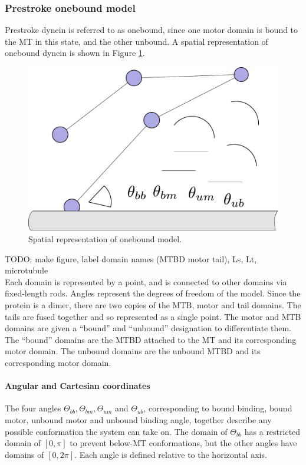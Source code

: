 \documentclass[10pt]{article} %
\begin{document}
\subsubsection{Prestroke onebound model}
Prestroke dynein is referred to as onebound, since one motor domain is bound to the MT in this state, and the other unbound. A spatial representation of onebound dynein is shown in Figure \ref{ob_fig}. 

\begin{figure}[h]
  \centering
  \includegraphics[width=.45\textwidth]{../../figures/ob_fig.pdf}
  \caption{Spatial representation of onebound model.}
  \label{ob_fig}
\end{figure}

TODO: make figure, label domain names (MTBD motor tail), Ls, Lt, microtubule\\

Each domain is represented by a point, and is connected to other domains via fixed-length rods. Angles represent the degrees of freedom of the model. Since the protein is a dimer, there are two copies of the MTB, motor and tail domains. The tails are fused together and so represented as a single point. The motor and MTB domains are given a ``bound'' and ``unbound'' designation to differentiate them. The ``bound'' domains are the MTBD attached to the MT and its corresponding motor domain. The unbound domains are the unbound MTBD and its corresponding motor domain.\\

\paragraph{Angular and Cartesian coordinates}

The four angles $\Theta_{bb}, \Theta_{bm}, \Theta_{um}$ and $\Theta_{ub}$, corresponding to bound binding, bound motor, unbound motor and unbound binding angle, together describe any possible conformation the system can take on. The domain of $\Theta_{bb}$ has a restricted domain of $[0,\pi]$ to prevent below-MT conformations, but the other angles have domains of $[0,2\pi]$. Each angle is defined relative to the horizontal axis.\\
\end{document}
